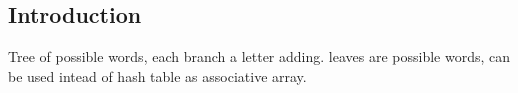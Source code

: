 
\subsection{Introduction}

Tree of possible words, each branch a letter adding. leaves are possible words, can be used intead of hash table as associative array.

